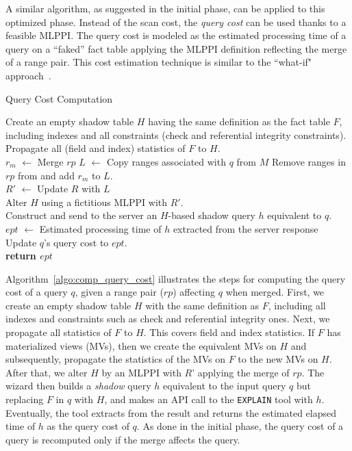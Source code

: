\documentclass[runningheads]{comsis2}
\begin{document}
A similar algorithm, as suggested in the initial phase, 
can be applied to this optimized phase. 
Instead of the scan cost, the {\em query cost} can be used thanks to a feasible MLPPI. 
The query cost is modeled as the estimated processing time 
of a query on a ``faked'' fact table applying the MLPPI definition 
reflecting the merge of a range pair. 
This cost estimation technique is similar 
to the ``\hbox{what-if}" approach~\cite{chaudhuri1998autoadmin}.

\begin{algorithm}[t]
\caption{Query Cost Computation}
\label{algo:comp_query_cost}
{
	Create an empty shadow table $H$ having the same definition as the fact table $F$, 
	including indexes and all constraints (check and referential integrity constraints). \\
	Propagate all (field and index) statistics of $F$ to $H$. \\
	$r_{m}$ $\leftarrow$ Merge $rp$ \;
	$L$ $\leftarrow$ Copy ranges associated with $q$ from $M$\; 
	Remove ranges in $rp$ from and add $r_{m}$ to $L$. \\
	$R'$ $\leftarrow$ Update $R$ with $L$ \\
	Alter $H$ using a fictitious MLPPI with $R'$. \\
	Construct and send to the server an $H$-based shadow query $h$ equivalent to $q$. \\	
	$ept$ $\leftarrow$ Estimated processing time of $h$ extracted from the server response \;
	Update $q$'s query cost to $ept$. \\
	{\bf return $ept$} 
}
\end{algorithm}

Algorithm~\ref{algo:comp_query_cost} illustrates the steps for computing 
the query cost of a query $q$, 
given a range pair ($rp$) affecting $q$ when merged. 
First, we create an empty shadow table $H$ with the same definition as $F$, 
including all indexes and constraints such as check and referential integrity 
ones. Next, we propagate all statistics of $F$ to $H$. 
This covers field and index statistics. 
If $F$ has materialized views (MVs), then we create the equivalent MVs on $H$ and subsequently, 
propagate the statistics of the MVs on $F$ to the new MVs on $H$. 
After that, we alter $H$ by an MLPPI with $R$' applying the merge of $rp$. 
The wizard then builds a {\em shadow} query $h$ equivalent to the input query $q$ 
but replacing $F$ in $q$ with $H$, and makes an API call to the {\tt EXPLAIN} tool with $h$. 
Eventually, the tool extracts from the result and returns the estimated elapsed time 
of $h$ as the query cost of $q$. 
As done in the initial phase, the query cost of a query is recomputed only if the merge affects the query.
\end{document}
